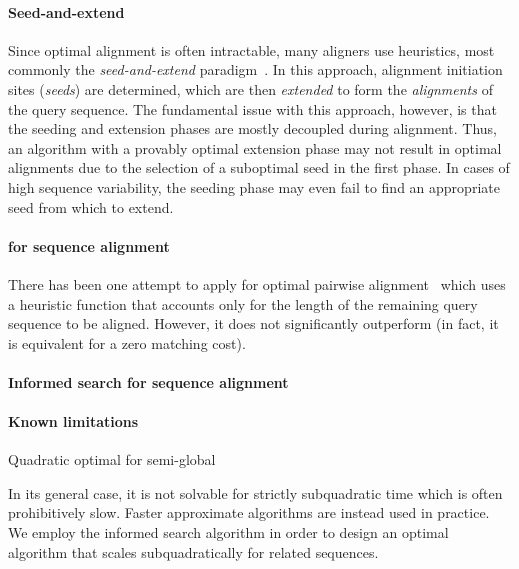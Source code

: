 \paragraph{Seed-and-extend}
Since optimal alignment is often intractable, many aligners use heuristics, most
commonly the \emph{seed-and-extend}
paradigm~\cite{altschul_basic_1990,langmead_fast_2012,li_fast_2009}. In this
approach, alignment initiation sites (\emph{seeds}) are determined, which are
then \emph{extended} to form the \emph{alignments} of the query sequence. The
fundamental issue with this approach, however, is that the seeding and extension
phases are mostly decoupled during alignment. Thus, an algorithm with a provably
optimal extension phase may not result in optimal alignments due to the
selection of a suboptimal seed in the first phase. In cases of high sequence
variability, the seeding phase may even fail to find an appropriate seed from
which to extend.

\paragraph{\A for sequence alignment}
There has been one attempt to apply \A for optimal pairwise
alignment~\cite{dox2018efficient} which uses a heuristic function that accounts
only for the length of the remaining query sequence to be aligned. However, it
does not significantly outperform \dijkstra (in fact, it is equivalent for a
zero matching cost).

\paragraph{Informed search for sequence alignment}

\paragraph{Known limitations}

Quadratic optimal for semi-global

In its general case, it is not solvable for strictly subquadratic time which is
often prohibitively slow. Faster approximate algorithms are instead used in
practice. We employ the \A informed search algorithm in order to design an
optimal algorithm that scales subquadratically for related sequences.